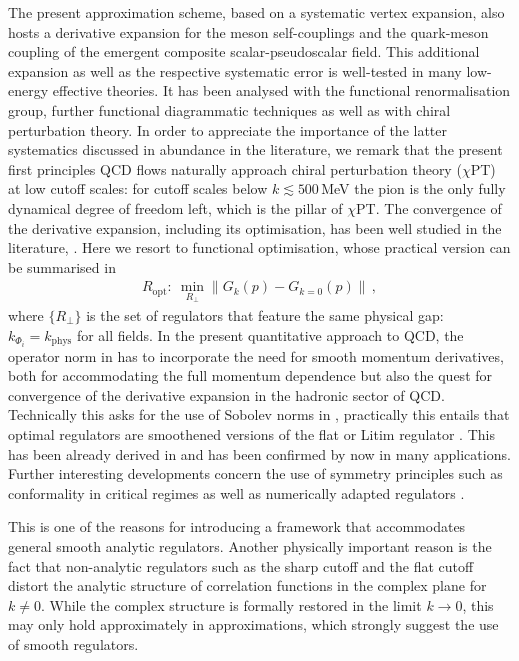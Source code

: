 \documentclass[aps,twocolumn,prd,superscriptaddress]{revtex4-2}
\begin{document}
The present approximation scheme, based on a systematic vertex expansion, also hosts a derivative expansion for the meson self-couplings and the quark-meson coupling of the emergent composite scalar-pseudoscalar field. This additional expansion as well as the respective systematic error is well-tested in many low-energy effective theories. It has been analysed with the functional renormalisation group, further functional diagrammatic techniques as well as with chiral perturbation theory. In order to appreciate the importance of the latter systematics discussed in abundance in the literature, we remark that the present first principles QCD flows naturally approach chiral perturbation theory ($\chi$PT) at low cutoff scales: for cutoff scales below $k\lesssim 500$\,MeV the pion is the only fully dynamical degree of freedom left, which is the pillar of $\chi$PT. The convergence of the derivative expansion, including its optimisation, has been well studied in the literature, \cite{ Morris:1993qb, Morris:1997xj, Canet:2002gs, Pawlowski:2005xe, Balog:2019rrg, DePolsi:2020pjk, DePolsi:2021cmi, DePolsi:2022wyb, Delamotte:2024xhn, Litim:2001dt, Bervillier:2007rc, Litim:2010tt}. Here we resort to functional optimisation, whose practical version can be summarised in 
%
\begin{align}
R_\textrm{opt}:\	\min_{R_\bot } \| G_k(p) - G_{k=0}(p)\| \,,
\label{eq:funOp}
\end{align}
%
where $\{R_\bot \}$ is the set of regulators that feature the same physical gap: $k_{\Phi_i} = k_\textrm{phys}$ for all fields. In the present quantitative approach to QCD, the operator norm in  has to incorporate the need for smooth momentum derivatives, both for accommodating the full momentum dependence but also the quest for convergence of the derivative expansion in the hadronic sector of QCD. Technically this asks for the use of Sobolev norms in 
, practically this entails that optimal regulators are smoothened versions of the flat or Litim regulator \cite{Litim:2001up}. This has been already derived in \cite{Pawlowski:2005xe} and has been confirmed by now in many applications. Further interesting developments concern the use of symmetry principles such as conformality in critical regimes \cite{Delamotte:2024xhn} as well as numerically adapted regulators \cite{Zorbach:2024zjx}. 

This is one of the reasons for introducing a framework that accommodates general smooth analytic regulators. Another physically important reason is the fact that non-analytic regulators such as the sharp cutoff and the flat cutoff distort the analytic structure of correlation functions in the complex plane for $k\neq 0$. While the complex structure is formally restored in the limit $k\to 0$, this may only hold approximately in approximations, which strongly suggest the use of smooth regulators. 
\end{document}

